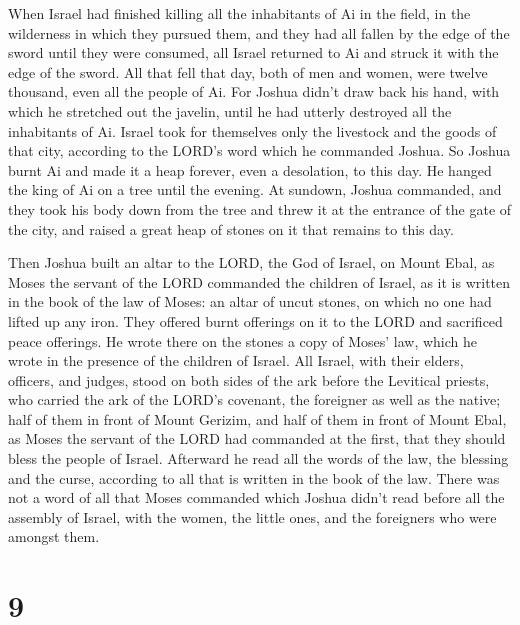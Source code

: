  When Israel had finished killing all the inhabitants of Ai
in the field, in the wilderness in which they pursued them, and they had
all fallen by the edge of the sword until they were consumed, all Israel
returned to Ai and struck it with the edge of the sword. 
All that fell that day, both of men and women, were twelve thousand,
even all the people of Ai.  For Joshua didn't draw back his
hand, with which he stretched out the javelin, until he had utterly
destroyed all the inhabitants of Ai.  Israel took for
themselves only the livestock and the goods of that city, according to
the LORD's word which he commanded Joshua.  So Joshua burnt
Ai and made it a heap forever, even a desolation, to this day.
 He hanged the king of Ai on a tree until the evening. At
sundown, Joshua commanded, and they took his body down from the tree and
threw it at the entrance of the gate of the city, and raised a great
heap of stones on it that remains to this day.

 Then Joshua built an altar to the LORD, the God of Israel,
on Mount Ebal,  as Moses the servant of the LORD commanded
the children of Israel, as it is written in the book of the law of
Moses: an altar of uncut stones, on which no one had lifted up any iron.
They offered burnt offerings on it to the LORD and sacrificed peace
offerings.  He wrote there on the stones a copy of Moses'
law, which he wrote in the presence of the children of Israel.
 All Israel, with their elders, officers, and judges, stood
on both sides of the ark before the Levitical priests, who carried the
ark of the LORD's covenant, the foreigner as well as the native; half of
them in front of Mount Gerizim, and half of them in front of Mount Ebal,
as Moses the servant of the LORD had commanded at the first, that they
should bless the people of Israel.  Afterward he read all
the words of the law, the blessing and the curse, according to all that
is written in the book of the law.  There was not a word of
all that Moses commanded which Joshua didn't read before all the
assembly of Israel, with the women, the little ones, and the foreigners
who were amongst them.

\hypertarget{section-8}{%
\section{9}\label{section-8}}

